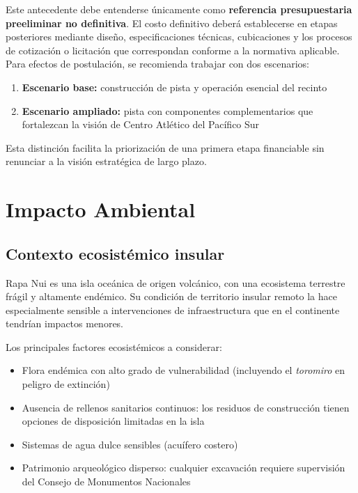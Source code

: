 \documentclass[12pt, a4paper]{article}
\begin{document}
Este antecedente debe entenderse únicamente como \textbf{referencia presupuestaria
preeliminar no definitiva}. El costo definitivo deberá establecerse en etapas
posteriores mediante diseño, especificaciones técnicas, cubicaciones y los
procesos de cotización o licitación que correspondan conforme a la normativa
aplicable. Para efectos de postulación, se recomienda trabajar con dos escenarios:

\begin{enumerate}[leftmargin=*, itemsep=3pt]
  \item \textbf{Escenario base:} construcción de pista y operación esencial del recinto
  \item \textbf{Escenario ampliado:} pista con componentes complementarios que
        fortalezcan la visión de Centro Atlético del Pacífico Sur
\end{enumerate}

Esta distinción facilita la priorización de una primera etapa financiable sin
renunciar a la visión estratégica de largo plazo.

\section{Impacto Ambiental}

\subsection{Contexto ecosistémico insular}

Rapa Nui es una isla oceánica de origen volcánico, con una ecosistema terrestre
frágil y altamente endémico. Su condición de territorio insular remoto la hace
especialmente sensible a intervenciones de infraestructura que en el continente
tendrían impactos menores.

Los principales factores ecosistémicos a considerar:

\begin{itemize}[leftmargin=*, itemsep=3pt]
  \item Flora endémica con alto grado de vulnerabilidad (incluyendo el \textit{toromiro}
        en peligro de extinción)
  \item Ausencia de rellenos sanitarios continuos: los residuos de construcción
        tienen opciones de disposición limitadas en la isla
  \item Sistemas de agua dulce sensibles (acuífero costero)
  \item Patrimonio arqueológico disperso: cualquier excavación requiere supervisión
        del Consejo de Monumentos Nacionales
\end{itemize}
\end{document}
